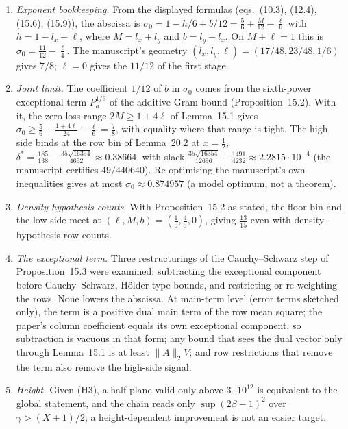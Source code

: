 \documentclass[11pt]{article}
\theoremstyle{definition}
\begin{document}
\begin{enumerate}[leftmargin=1.8em]
\item \emph{Exponent bookkeeping.} From the displayed formulas (eqs.~(10.3), (12.4), (15.6),
(15.9)), the abscissa is $\sigma_0=1-h/6+b/12=\frac56+\frac M{12}-\frac\ell6$ with
$h=1-l_x+\ell$, where $M=l_x+l_y$ and $b=l_y-l_x$. On $M+\ell=1$ this is
$\sigma_0=\frac{11}{12}-\frac\ell4$. The manuscript's geometry
$(l_x,l_y,\ell)=(17/48,23/48,1/6)$ gives $7/8$; $\ell=0$ gives the $11/12$ of the first stage.
\item \emph{Joint limit.} The coefficient $1/12$ of $b$ in $\sigma_0$ comes from the
sixth-power exceptional term $P_a^{1/6}$ of the additive Gram bound (Proposition~15.2). With
it, the zero-loss range $2M\ge1+4\ell$ of Lemma~15.1 gives
$\sigma_0\ge\frac56+\frac{1+4\ell}{24}-\frac\ell6=\frac78$, with equality where that range is
tight. The high side binds at the row bin of Lemma~20.2 at $x=\frac12$,
$\delta^*=\frac{185}{138}-\frac{35\sqrt{16354}}{4692}\approx0.38664$, with slack
$\frac{35\sqrt{16354}}{12696}-\frac{1491}{4232}\approx2.2815\cdot10^{-4}$ (the manuscript
certifies $49/440640$). Re-optimising the manuscript's own inequalities gives at most
$\sigma_0\approx0.874957$ (a model optimum, not a theorem).
\item \emph{Density-hypothesis counts.} With Proposition~15.2 as stated, the floor bin and the
low side meet at $(\ell,M,b)=(\frac15,\frac45,0)$, giving $\frac{13}{15}$ even with
density-hypothesis row counts.
\item \emph{The exceptional term.} Three restructurings of the Cauchy--Schwarz step of
Proposition~15.3 were examined: subtracting the exceptional component before
Cauchy--Schwarz, H\"older-type bounds, and restricting or re-weighting the rows. None lowers
the abscissa. At main-term level (error terms sketched only), the term is a positive dual main
term of the row mean square; the paper's column
coefficient equals its own exceptional component, so subtraction is vacuous in that form; any
bound that sees the dual vector only through Lemma~15.1 is at least $\|A\|_2V$; and row
restrictions that remove the term also remove the high-side signal.
\item \emph{Height.} Given (H3), a half-plane valid only above $3\cdot10^{12}$ is equivalent
to the global statement, and the chain reads only $\sup(2\beta-1)^2$ over
$\gamma>(X+1)/2$; a height-dependent improvement is not an easier target.
\end{enumerate}
\end{document}
